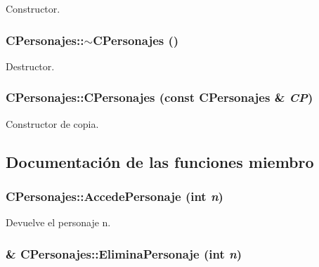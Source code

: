 Constructor. 

\hypertarget{class_c_personajes_3bcd959bc1702107853482729687b1e0}{
\subsubsection[{$\sim$CPersonajes}]{\setlength{\rightskip}{0pt plus 5cm}CPersonajes::$\sim$CPersonajes ()}}
\label{class_c_personajes_3bcd959bc1702107853482729687b1e0}


Destructor. 

\hypertarget{class_c_personajes_d74cf8097ab2684867204fda7d5f1443}{
\subsubsection[{CPersonajes}]{\setlength{\rightskip}{0pt plus 5cm}CPersonajes::CPersonajes (const {\bf CPersonajes} \& {\em CP})}}
\label{class_c_personajes_d74cf8097ab2684867204fda7d5f1443}


Constructor de copia. 



\subsection{Documentación de las funciones miembro}
\hypertarget{class_c_personajes_7aa7d31aa91c44660857df971242f9f3}{
\subsubsection[{AccedePersonaje}]{ CPersonajes::AccedePersonaje (int {\em n})}}
\label{class_c_personajes_7aa7d31aa91c44660857df971242f9f3}


Devuelve el personaje n. 

\hypertarget{class_c_personajes_43e8d3445e65eb0ab0d4b842a7e73a3a}{
\subsubsection[{EliminaPersonaje}]{ \& CPersonajes::EliminaPersonaje (int {\em n})}}
\label{class_c_personajes_43e8d3445e65eb0ab0d4b842a7e73a3a}


